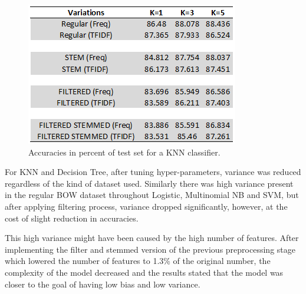 \documentclass[conference]{IEEEtran}
\begin{document}
\begin{figure}[htbp]
\centerline{\includegraphics[width=0.9\columnwidth]{knn-prediction.png}}
\caption{Accuracies in percent of test set for a KNN classifier.}
\label{fig}
\end{figure}
\FloatBarrier
For KNN and Decision Tree, after tuning hyper-parameters, variance was reduced regardless of the kind of dataset used. Similarly there was high variance present in the regular BOW dataset throughout Logistic, Multinomial NB and SVM, but after applying filtering process, variance dropped significantly, however, at the cost of slight reduction in accuracies. 

This high variance might have been caused by the high number of features. After implementing the filter and stemmed version of the previous preprocessing stage which lowered the number of features to 1.3\% of the original number, the complexity of the model decreased and the results stated that the model was closer to the goal of having low bias and low variance. 
\end{document}

